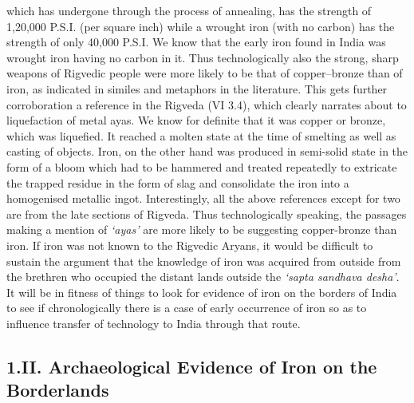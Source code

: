 which has undergone through the process of annealing, has the strength of 1,20,000 P.S.I. (per square inch) while a wrought iron (with no carbon) has the strength of only 40,000 P.S.I. We know that the early iron found in India was wrought iron having no carbon in it. Thus technologically also the strong, sharp weapons of Rigvedic people were more likely to be that of copper–bronze than of iron, as indicated in similes and metaphors in the literature. This gets further corroboration a reference in the Rigveda (VI 3.4), which clearly narrates about to liquefaction of metal ayas. We know for definite that it was copper or bronze, which was liquefied. It reached a molten state at the time of smelting as well as casting of objects. Iron, on the other hand was produced in semi-solid state in the form of a bloom which had to be hammered and treated repeatedly to extricate the trapped residue in the form of slag and consolidate the iron into a homogenised metallic ingot. Interestingly, all the above references except for two are from the late sections of Rigveda. Thus technologically speaking, the passages making a mention of \textit{‘ayas’} are more likely to be suggesting copper-bronze than iron. If iron was not known to the Rigvedic Aryans, it would be difficult to sustain the argument that the knowledge of iron was acquired from outside from the brethren who occupied the distant lands outside the \textit{‘sapta sandhava desha’}. It will be in fitness of things to look for evidence of iron on the borders of India to see if chronologically there is a case of early occurrence of iron so as to influence transfer of technology to India through that route. 

\vspace{-.3cm}

\subsection*{1.II. Archaeological Evidence of Iron on the\\ Borderlands}\label{chapter3-subsection-2}

\vspace{-.2cm}

